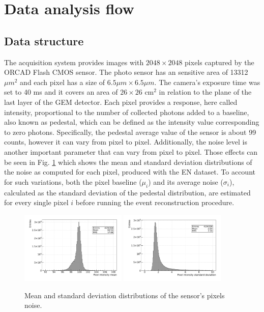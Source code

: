 \documentclass[a4paper,11pt]{article}
\begin{document}
\section{Data analysis flow}
\label{sec:daq}

\subsection{Data structure}

The acquisition system provides images with $2048 \times 2048$ pixels captured by the ORCAD Flash CMOS sensor. The photo sensor has an sensitive area of 13312 $\mu m^2$ and each pixel has a size of $6.5 \mu m \times 6.5 \mu m$.
The camera's exposure time was set to 40 ms and it covers an area of $26 \times 26$ cm$^2$ in relation to the plane of the last layer of the GEM detector. Each pixel provides a response, here called intensity, proportional to the number of collected photons \cite{bib:nim_orange1} added to a baseline, also known as pedestal, which can be defined as the intensity value corresponding to zero photons. Specifically, the pedestal average value of the sensor is about 99 counts, however it can vary from pixel to pixel.
Additionally, the noise level is another important parameter that can vary from pixel to pixel.
Those effects can be seen in Fig. \ref{fig:sensor_noise} which shows the mean and standard deviation distributions of the noise as computed for each pixel, produced with the EN dataset.
To account for such variations, both the pixel baseline ($\mu_i$) and its average noise ($\sigma_i$), calculated as the standard deviation of the pedestal distribution,  are estimated for every single pixel $i$ before running the event reconstruction procedure.



\begin{figure}[ht]
\centering
\includegraphics[width=0.45\textwidth]{Mean_2155.pdf}
\includegraphics[width=0.45\textwidth]{Std_2155.pdf}
\caption{Mean and standard deviation distributions of the sensor's pixels noise.}
\label{fig:sensor_noise}
\end{figure}
\end{document}
